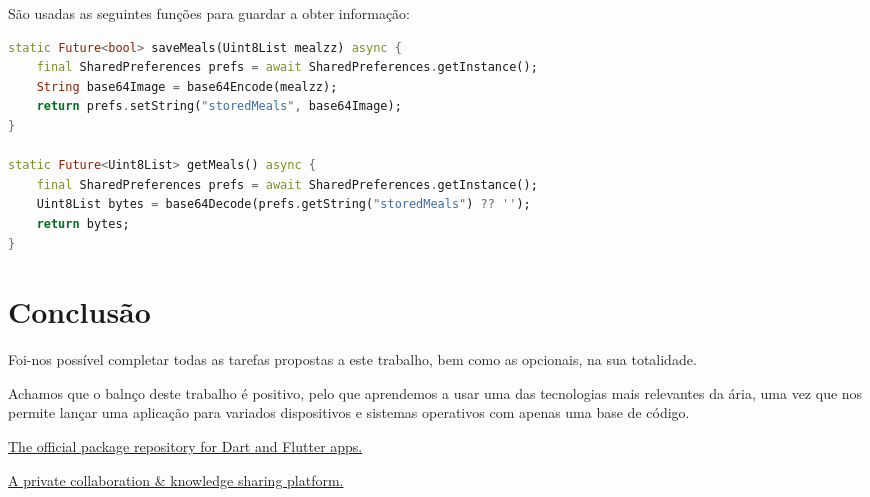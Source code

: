 \documentclass[10pt]{article}
\begin{document}
 São usadas as seguintes funções para guardar a obter informação:

\begin{lstlisting}[language=Dart]
static Future<bool> saveMeals(Uint8List mealzz) async {
    final SharedPreferences prefs = await SharedPreferences.getInstance();
    String base64Image = base64Encode(mealzz);
    return prefs.setString("storedMeals", base64Image);
}

static Future<Uint8List> getMeals() async {
    final SharedPreferences prefs = await SharedPreferences.getInstance();
    Uint8List bytes = base64Decode(prefs.getString("storedMeals") ?? '');
    return bytes;
}
\end{lstlisting}
 

\section{Conclusão} 

 	Foi-nos possível completar todas as tarefas propostas a este trabalho, bem como as opcionais, na sua totalidade.

  Achamos que o balnço deste trabalho é positivo, pelo que aprendemos a usar uma das tecnologias mais relevantes da ária, uma vez que nos permite lançar uma aplicação para variados dispositivos e sistemas operativos com apenas uma base de código.


\begin{thebibliography}{1}
	\href{https://pub.dev}{The official package repository for Dart and Flutter apps.}

	\href{https://stackoverflow.com}{A private collaboration & knowledge sharing platform.}
\end{thebibliography}
\end{document}
